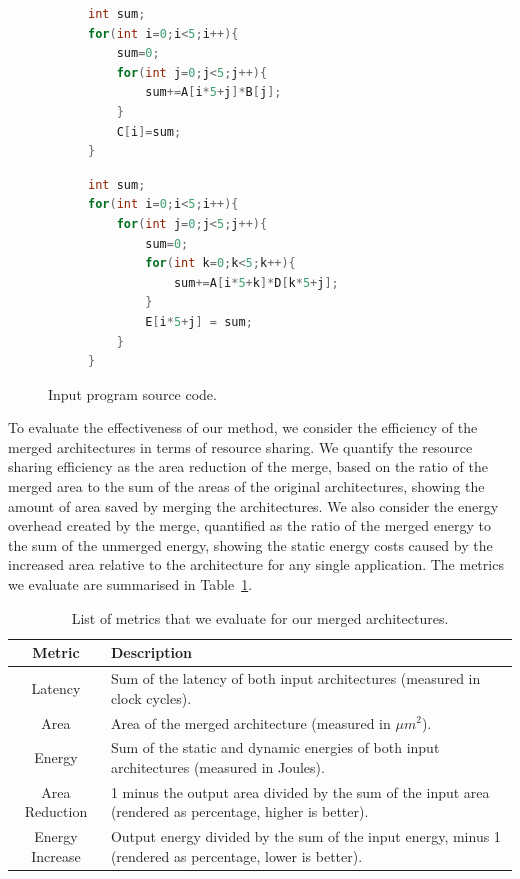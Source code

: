 \begin{figure}[!htb]
    \begin{subfigure}[t]{0.5\textwidth}
\begin{lstlisting}[title={$5 \times 5$ matrix-vector multiplication}, language=c]
int sum;
for(int i=0;i<5;i++){
    sum=0;
    for(int j=0;j<5;j++){
        sum+=A[i*5+j]*B[j];
    }
    C[i]=sum;
}

    \end{lstlisting}
    \end{subfigure}
    \begin{subfigure}[t]{0.5\textwidth}
\begin{lstlisting}[title={$5 \times 5$ matrix-matrix multiplication}, language=c, numbers=right]
int sum;
for(int i=0;i<5;i++){
    for(int j=0;j<5;j++){
        sum=0;
        for(int k=0;k<5;k++){
            sum+=A[i*5+k]*D[k*5+j];
        }
        E[i*5+j] = sum;
    }
}
\end{lstlisting}
    \end{subfigure}
    \caption{Input program source code.}
    \label{fig:source}
\end{figure}

To evaluate the effectiveness of our method, we consider the efficiency of the merged architectures in terms of resource sharing. We quantify the resource sharing efficiency as the area reduction of the merge, based on the ratio of the merged area to the sum of the areas of the original architectures, showing the amount of area saved by merging the architectures. We also consider the energy overhead created by the merge, quantified as the ratio of the merged energy to the sum of the unmerged energy, showing the static energy costs caused by the increased area relative to the architecture for any single application. The metrics we evaluate are summarised in Table~\ref{tab:evaluationmetrics}.

\begin{table}[!htb]
    \centering
    \begin{tabularx}{\textwidth}{|c|X|}
    \hline
    \textbf{Metric} & \textbf{Description}\\
    \hline
    Latency & Sum of the latency of both input architectures (measured in clock cycles).\\
    Area & Area of the merged architecture (measured in $\mu m^2$).\\
    Energy & Sum of the static and dynamic energies of both input architectures (measured in Joules).\\
    Area Reduction & 1 minus the output area divided by the sum of the input area (rendered as percentage, higher is better).\\
    Energy Increase & Output energy divided by the sum of the input energy, minus 1 (rendered as percentage, lower is better).\\
    \hline
    \end{tabularx}
    \caption{List of metrics that we evaluate for our merged architectures.}
    \label{tab:evaluationmetrics}
\end{table}

